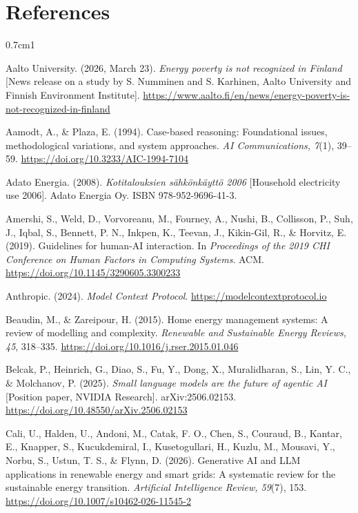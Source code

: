 \documentclass[12pt,a4paper]{report}
\begin{document}
\chapter*{References}

\begin{hangparas}{0.7cm}{1}

Aalto University. (2026, March 23). \textit{Energy poverty is not
recognized in Finland} [News release on a study by S. Numminen and S.
Karhinen, Aalto University and Finnish Environment Institute].
\url{https://www.aalto.fi/en/news/energy-poverty-is-not-recognized-in-finland}

Aamodt, A., \& Plaza, E. (1994). Case-based reasoning: Foundational
issues, methodological variations, and system approaches. \textit{AI
Communications, 7}(1), 39--59. \url{https://doi.org/10.3233/AIC-1994-7104}

Adato Energia. (2008). \textit{Kotitalouksien sähkönkäyttö 2006}
[Household electricity use 2006]. Adato Energia Oy.
ISBN 978-952-9696-41-3.

Amershi, S., Weld, D., Vorvoreanu, M., Fourney, A., Nushi, B., Collisson,
P., Suh, J., Iqbal, S., Bennett, P. N., Inkpen, K., Teevan, J.,
Kikin-Gil, R., \& Horvitz, E. (2019). Guidelines for human-AI
interaction. In \textit{Proceedings of the 2019 CHI Conference on Human
Factors in Computing Systems}. ACM.
\url{https://doi.org/10.1145/3290605.3300233}

Anthropic. (2024). \textit{Model Context Protocol}.
\url{https://modelcontextprotocol.io}

Beaudin, M., \& Zareipour, H. (2015). Home energy management systems: A
review of modelling and complexity. \textit{Renewable and Sustainable
Energy Reviews, 45}, 318--335.
\url{https://doi.org/10.1016/j.rser.2015.01.046}

Belcak, P., Heinrich, G., Diao, S., Fu, Y., Dong, X., Muralidharan, S.,
Lin, Y. C., \& Molchanov, P. (2025). \textit{Small language models are
the future of agentic AI} [Position paper, NVIDIA Research].
arXiv:2506.02153. \url{https://doi.org/10.48550/arXiv.2506.02153}

Cali, U., Halden, U., Andoni, M., Catak, F. O., Chen, S., Couraud, B.,
Kantar, E., Knapper, S., Kucukdemiral, I., Kusetogullari, H., Kuzlu, M.,
Mousavi, Y., Norbu, S., Ustun, T. S., \& Flynn, D. (2026). Generative AI
and LLM applications in renewable energy and smart grids: A systematic
review for the sustainable energy transition. \textit{Artificial
Intelligence Review, 59}(7), 153.
\url{https://doi.org/10.1007/s10462-026-11545-2}


\end{hangparas}
\end{document}
